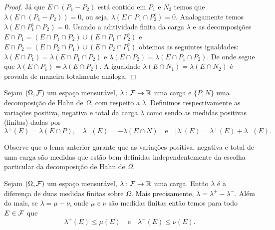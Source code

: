 \begin{proof}
Já que $E\cap (P_1-P_2)$ está contido em $P_1$ e $N_2$
temos que $\lambda(E\cap(P_1-P_2) )=0$, ou seja,
$\lambda(E\cap P_1\cap P^c_2)=0$.
Analogamente 
temos $\lambda(E\cap P^c_1\cap P_2) = 0$.
Usando a aditividade finita da carga $\lambda$ 
e as decomposições 
$E\cap P_1 = (E\cap P_1\cap P_2) \cup (E\cap P_1\cap P^c_2) $ 
e 
$E\cap P_2 = (E\cap P_2\cap P_1) \cup (E\cap P_2\cap P^c_1) $ 
obtemos as seguintes igualdades:
$
\lambda(E\cap P_1)=\lambda(E\cap P_1\cap P_2)
$ 
e
$
\lambda(E\cap P_2)=\lambda(E\cap P_1\cap P_2).
$
De onde segue que $\lambda(E\cap P_1)= \lambda(E\cap P_2)$.
A igualdade $\lambda(E \cap N_1) = \lambda(E \cap N_2)$
é provada de maneira totalmente análoga.
\end{proof}







\begin{definicao}
Sejam $(\Omega,\mathcal{F})$ um espaço mensurável, $\lambda:\mathcal{F}\to\mathbb{R}$
uma carga e $\{P,N\}$ uma decomposição de Hahn de $\Omega$, 
com respeito a $\lambda$. Definimos respectivamente as
variações positiva, negativa e total da carga $\lambda$ 
como sendo as medidas positivas (finitas) dadas por 
\[
\lambda^+(E)
=
\lambda(E\cap P),
\quad
\lambda^-(E)
=
-\lambda(E\cap N)
\quad\text{e}\quad
|\lambda|(E) = \lambda^+(E)+\lambda^-(E).
\]
\end{definicao}

Observe que o lema anterior garante que as variações 
positiva, negativa e total de uma carga são 
medidas que estão bem definidas independentemente 
da escolha particular da decomposição de Hahn de $\Omega$.


\begin{teorema}
\label{teo-dec-Jordan}
Sejam $(\Omega,\mathcal{F})$ um espaço mensurável, $\lambda:\mathcal{F}\to\mathbb{R}$
uma carga. Então $\lambda$ é a diferença de duas medidas finitas
sobre $\Omega$. Mais precisamente, $\lambda = \lambda^+-\lambda^-$.
Além do mais, se $\lambda = \mu-\nu$, onde $\mu$ e $\nu$
são medidas finitas então temos para todo $E\in\mathcal{F}$ que 
\[
\lambda^+(E)\leq \mu(E)
\quad\text{e}\quad
\lambda^-(E)\leq \nu (E).
\]
\end{teorema}



